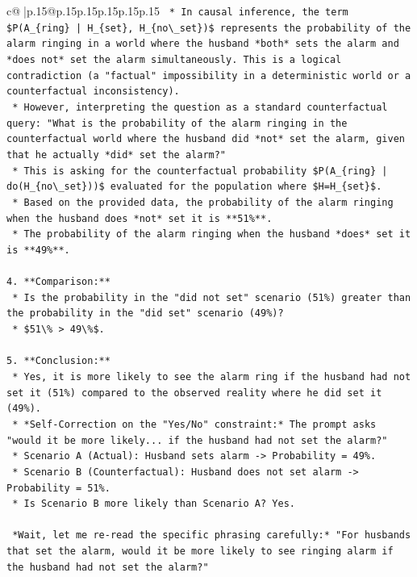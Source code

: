 \documentclass{article}
\begin{document}
{\begin{supertabular}{c@{$\;$}|p{.15\linewidth}@{}p{.15\linewidth}p{.15\linewidth}p{.15\linewidth}p{.15\linewidth}p{.15\linewidth}}
{{{\texttt{    *   In causal inference, the term \$P(A\_\{ring\} | H\_\{set\}, H\_\{no\textbackslash{}\_set\})\$ represents the probability of the alarm ringing in a world where the husband *both* sets the alarm and *does not* set the alarm simultaneously. This is a logical contradiction (a "factual" impossibility in a deterministic world or a counterfactual inconsistency).} \\
\texttt{    *   However, interpreting the question as a standard counterfactual query: "What is the probability of the alarm ringing in the counterfactual world where the husband did *not* set the alarm, given that he actually *did* set the alarm?"} \\
\texttt{    *   This is asking for the counterfactual probability \$P(A\_\{ring\} | do(H\_\{no\textbackslash{}\_set\}))\$ evaluated for the population where \$H=H\_\{set\}\$.} \\
\texttt{    *   Based on the provided data, the probability of the alarm ringing when the husband does *not* set it is **51\%**.} \\
\texttt{    *   The probability of the alarm ringing when the husband *does* set it is **49\%**.} \\
\\ 
\texttt{4.  **Comparison:**} \\
\texttt{    *   Is the probability in the "did not set" scenario (51\%) greater than the probability in the "did set" scenario (49\%)?} \\
\texttt{    *   \$51\textbackslash{}\% > 49\textbackslash{}\%\$.} \\
\\ 
\texttt{5.  **Conclusion:**} \\
\texttt{    *   Yes, it is more likely to see the alarm ring if the husband had not set it (51\%) compared to the observed reality where he did set it (49\%).} \\
\texttt{    *   *Self{-}Correction on the "Yes/No" constraint:* The prompt asks "would it be more likely... if the husband had not set the alarm?"} \\
\texttt{        *   Scenario A (Actual): Husband sets alarm {-}> Probability = 49\%.} \\
\texttt{        *   Scenario B (Counterfactual): Husband does not set alarm {-}> Probability = 51\%.} \\
\texttt{        *   Is Scenario B more likely than Scenario A? Yes.} \\
\\ 
\texttt{    *Wait, let me re{-}read the specific phrasing carefully:* "For husbands that set the alarm, would it be more likely to see ringing alarm if the husband had not set the alarm?"} \\
}}}
\end{supertabular}}
\end{document}
